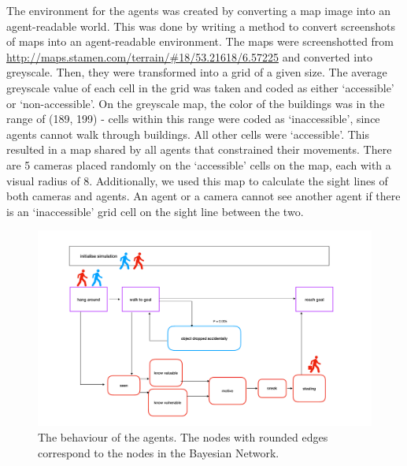 The environment for the agents was created by converting a map image into an agent-readable world. This was done by writing a method to convert screenshots of maps into an agent-readable environment. The maps were screenshotted from \url{http://maps.stamen.com/terrain/#18/53.21618/6.57225} and converted into greyscale. Then, they were transformed into a grid of a given size. The average greyscale value of each cell in the grid was taken and coded as either `accessible' or `non-accessible'. On the greyscale map, the color of the buildings was in the range of (189, 199) - cells within this range were coded as `inaccessible', since agents cannot walk through buildings. All other cells were `accessible'. This resulted in a map shared by all agents that constrained their movements. There are 5 cameras placed randomly on the `accessible' cells on the map, each with a visual radius of 8. Additionally, we used this map to calculate the sight lines of both cameras and agents. An agent or a camera cannot see another agent if there is an `inaccessible' grid cell on the sight line between the two.



\begin{figure}[htbp]
\begin{center}
\includegraphics[width=\linewidth]{images/grotemarkt.pdf}
\end{center}
\caption{The behaviour of the agents. The nodes with rounded edges correspond to the nodes in the Bayesian Network.}
\label{behaviourGM}
\end{figure}


